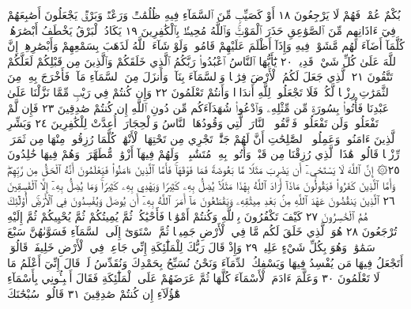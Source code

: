 بُكْمٌ عُمْيࣱ فَهُمْ لَا يَرْجِعُونَ ١٨ أَوْ كَصَيِّبࣲ مِّنَ ٱلسَّمَآءِ فِيهِ
ظُلُمَٰتࣱ وَرَعْدࣱ وَبَرْقࣱ يَجْعَلُونَ أَصَٰبِعَهُمْ فِيٓ ءَاذَانِهِم مِّنَ
ٱلصَّوَٰعِقِ حَذَرَ ٱلْمَوْتِۚ وَٱللَّهُ مُحِيطُۢ بِٱلْكَٰفِرِينَ ١٩ يَكَادُ ٱلْبَرْقُ
يَخْطَفُ أَبْصَٰرَهُمْۖ كُلَّمَآ أَضَآءَ لَهُم مَّشَوْا۟ فِيهِ وَإِذَآ أَظْلَمَ عَلَيْهِمْ
قَامُوا۟ۚ وَلَوْ شَآءَ ٱللَّهُ لَذَهَبَ بِسَمْعِهِمْ وَأَبْصَٰرِهِمْۚ إِنَّ ٱللَّهَ عَلَىٰ
كُلِّ شَيْءࣲ قَدِيرࣱ ٢٠ يَٰٓأَيُّهَا ٱلنَّاسُ ٱعْبُدُوا۟ رَبَّكُمُ ٱلَّذِي
خَلَقَكُمْ وَٱلَّذِينَ مِن قَبْلِكُمْ لَعَلَّكُمْ تَتَّقُونَ ٢١ ٱلَّذِي جَعَلَ لَكُمُ
ٱلْأَرْضَ فِرَٰشࣰا وَٱلسَّمَآءَ بِنَآءࣰ وَأَنزَلَ مِنَ ٱلسَّمَآءِ مَآءࣰ فَأَخْرَجَ
بِهِۦ مِنَ ٱلثَّمَرَٰتِ رِزْقࣰا لَّكُمْۖ فَلَا تَجْعَلُوا۟ لِلَّهِ أَندَادࣰا وَأَنتُمْ
تَعْلَمُونَ ٢٢ وَإِن كُنتُمْ فِي رَيْبࣲ مِّمَّا نَزَّلْنَا عَلَىٰ عَبْدِنَا فَأْتُوا۟
بِسُورَةࣲ مِّن مِّثْلِهِۦ وَٱدْعُوا۟ شُهَدَآءَكُم مِّن دُونِ ٱللَّهِ إِن
كُنتُمْ صَٰدِقِينَ ٢٣ فَإِن لَّمْ تَفْعَلُوا۟ وَلَن تَفْعَلُوا۟ فَٱتَّقُوا۟ ٱلنَّارَ
ٱلَّتِي وَقُودُهَا ٱلنَّاسُ وَٱلْحِجَارَةُۖ أُعِدَّتْ لِلْكَٰفِرِينَ ٢٤
وَبَشِّرِ ٱلَّذِينَ ءَامَنُوا۟ وَعَمِلُوا۟ ٱلصَّٰلِحَٰتِ أَنَّ لَهُمْ جَنَّٰتࣲ
تَجْرِي مِن تَحْتِهَا ٱلْأَنْهَٰرُۖ كُلَّمَا رُزِقُوا۟ مِنْهَا مِن ثَمَرَةࣲ
رِّزْقࣰا قَالُوا۟ هَٰذَا ٱلَّذِي رُزِقْنَا مِن قَبْلُۖ وَأُتُوا۟ بِهِۦ مُتَشَٰبِهࣰاۖ
وَلَهُمْ فِيهَآ أَزْوَٰجࣱ مُّطَهَّرَةࣱۖ وَهُمْ فِيهَا خَٰلِدُونَ ٢٥۞ إِنَّ
ٱللَّهَ لَا يَسْتَحْيِۦٓ أَن يَضْرِبَ مَثَلࣰا مَّا بَعُوضَةࣰ فَمَا فَوْقَهَاۚ فَأَمَّا
ٱلَّذِينَ ءَامَنُوا۟ فَيَعْلَمُونَ أَنَّهُ ٱلْحَقُّ مِن رَّبِّهِمْۖ وَأَمَّا
ٱلَّذِينَ كَفَرُوا۟ فَيَقُولُونَ مَاذَآ أَرَادَ ٱللَّهُ بِهَٰذَا مَثَلࣰاۘ
يُضِلُّ بِهِۦ كَثِيرࣰا وَيَهْدِي بِهِۦ كَثِيرࣰاۚ وَمَا يُضِلُّ بِهِۦٓ
إِلَّا ٱلْفَٰسِقِينَ ٢٦ ٱلَّذِينَ يَنقُضُونَ عَهْدَ ٱللَّهِ مِنۢ بَعْدِ
مِيثَٰقِهِۦ وَيَقْطَعُونَ مَآ أَمَرَ ٱللَّهُ بِهِۦٓ أَن يُوصَلَ وَيُفْسِدُونَ
فِي ٱلْأَرْضِۚ أُو۟لَٰٓئِكَ هُمُ ٱلْخَٰسِرُونَ ٢٧ كَيْفَ
تَكْفُرُونَ بِٱللَّهِ وَكُنتُمْ أَمْوَٰتࣰا فَأَحْيَٰكُمْۖ ثُمَّ يُمِيتُكُمْ
ثُمَّ يُحْيِيكُمْ ثُمَّ إِلَيْهِ تُرْجَعُونَ ٢٨ هُوَ ٱلَّذِي خَلَقَ
لَكُم مَّا فِي ٱلْأَرْضِ جَمِيعࣰا ثُمَّ ٱسْتَوَىٰٓ إِلَى ٱلسَّمَآءِ
فَسَوَّىٰهُنَّ سَبْعَ سَمَٰوَٰتࣲۚ وَهُوَ بِكُلِّ شَيْءٍ عَلِيمࣱ ٢٩
وَإِذْ قَالَ رَبُّكَ لِلْمَلَٰٓئِكَةِ إِنِّي جَاعِلࣱ فِي ٱلْأَرْضِ خَلِيفَةࣰۖ قَالُوٓا۟
أَتَجْعَلُ فِيهَا مَن يُفْسِدُ فِيهَا وَيَسْفِكُ ٱلدِّمَآءَ وَنَحْنُ نُسَبِّحُ
بِحَمْدِكَ وَنُقَدِّسُ لَكَۖ قَالَ إِنِّيٓ أَعْلَمُ مَا لَا تَعْلَمُونَ ٣٠ وَعَلَّمَ
ءَادَمَ ٱلْأَسْمَآءَ كُلَّهَا ثُمَّ عَرَضَهُمْ عَلَى ٱلْمَلَٰٓئِكَةِ فَقَالَ
أَنۢبِـُٔونِي بِأَسْمَآءِ هَٰٓؤُلَآءِ إِن كُنتُمْ صَٰدِقِينَ ٣١ قَالُوا۟ سُبْحَٰنَكَ
